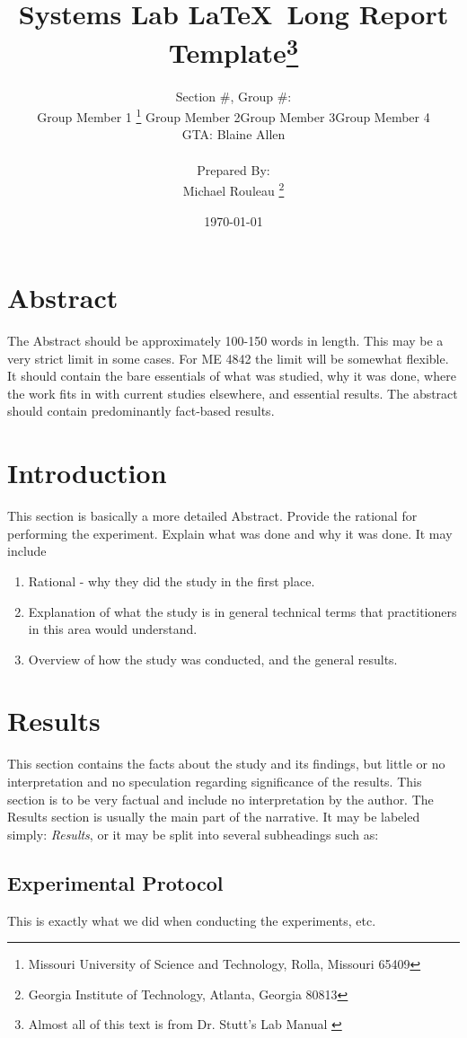 \documentclass[11pt,letter]{report}
\title{\Huge{Systems Lab \LaTeX\  Long Report Template}\footnote{Almost all of this text is from Dr. Stutt's Lab Manual \cite{Stutts}}}
\author{Section \#, Group \#: \\
	Group Member 1 \footnote{Missouri University of Science and Technology, Rolla, Missouri 65409} 
	\quad Group Member 2\footnotemark[1]
	\quad Group Member 3\footnotemark[1]
	\quad Group Member 4\footnotemark[1] 
	\\ GTA: Blaine Allen \\ \\ 
	Prepared By: \\ Michael Rouleau \footnote{Georgia Institute of Technology, Atlanta, Georgia 80813}
}
\date{\today}
\begin{document}
\maketitle

\section*{Abstract}
The Abstract should be approximately 100-150 words in length. This may be a very strict limit in some cases. For ME 4842 the limit will be somewhat flexible. It should contain the bare essentials of what was studied, why it was done, where the work fits in with current studies elsewhere, and essential results. The abstract should contain predominantly fact-based results.

\section*{Introduction}
This section is basically a more detailed Abstract. Provide the rational for performing the experiment. Explain what was done and why it was done. It may include
	\begin{enumerate} %
		\item Rational - why they did the study in the first place.
		\item Explanation of what the study is in general technical terms that practitioners in this area would understand.
		\item Overview of how the study was conducted, and the general results.
	\end{enumerate}

\section*{Results}
This section contains the facts about the study and its findings, but little or no interpretation and no speculation regarding significance of the results. This section is to be very factual and include no interpretation by the author. The Results section is usually the main part of the narrative. It may be labeled simply: \emph{Results}, or it may be split into several subheadings such as:

	\subsection*{Experimental Protocol}
		This is exactly what we did when conducting the experiments, etc.
\end{document}

